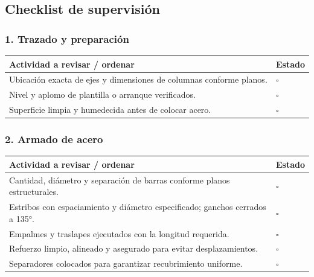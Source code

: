 \documentclass[12pt]{article}
\newcommand{\cbox}{\(\square\)}
\renewcommand{\cbox}{\(\square\)} %
\begin{document}
	\subsection{Checklist de supervisión}
	
	\subsubsection*{1. Trazado y preparación}
	\begin{tabularx}{\linewidth}{>{\raggedright\arraybackslash}p{0.93\linewidth} >{\centering\arraybackslash}m{0.07\linewidth}}
		\toprule
		\textbf{Actividad a revisar / ordenar} & \textbf{Estado}\\
		\midrule
		Ubicación exacta de ejes y dimensiones de columnas conforme planos. & \cbox \\
		Nivel y aplomo de plantilla o arranque verificados. & \cbox \\
		Superficie limpia y humedecida antes de colocar acero. & \cbox \\
		\bottomrule
	\end{tabularx}
	
	\subsubsection*{2. Armado de acero}
	\begin{tabularx}{\linewidth}{>{\raggedright\arraybackslash}p{0.93\linewidth} >{\centering\arraybackslash}m{0.07\linewidth}}
		\toprule
		\textbf{Actividad a revisar / ordenar} & \textbf{Estado}\\
		\midrule
		Cantidad, diámetro y separación de barras conforme planos estructurales. & \cbox \\
		Estribos con espaciamiento y diámetro especificado; ganchos cerrados a 135°. & \cbox \\
		Empalmes y traslapes ejecutados con la longitud requerida. & \cbox \\
		Refuerzo limpio, alineado y asegurado para evitar desplazamientos. & \cbox \\
		Separadores colocados para garantizar recubrimiento uniforme. & \cbox \\
		\bottomrule
	\end{tabularx}
	
\end{document}
